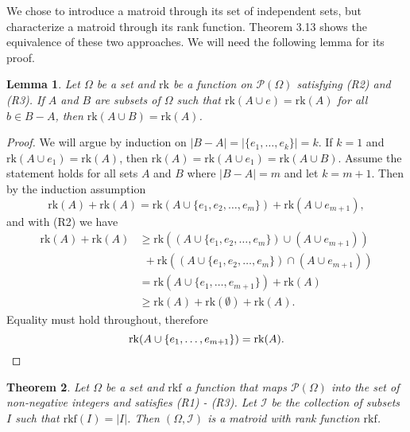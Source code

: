 \documentclass[12pt,a4paper, twoside, autooneside=false]{scrartcl}
\newtheorem{theorem}{Theorem}[section]
\newtheorem{lemma}[theorem]{Lemma}
\theoremstyle{definition}
\theoremstyle{remark}
\numberwithin{equation}{section}
\begin{document}
We chose to introduce a matroid through its set of independent sets, but \cite{GoRo2001} characterize a matroid through its rank function.
Theorem 3.13 shows the equivalence of these two approaches. We will need the following lemma for its proof.
\begin{lemma}
Let $\Omega$ be a set and $\mathrm{rk}$ be a function on $\mathcal{P}(\Omega)$ satisfying (R2) and (R3). If $A$ and $B$ are subsets of $\Omega$ such that $\mathrm{rk}(A \cup e) = \mathrm{rk}(A)$ for all $b \in B - A$, then $\mathrm{rk}(A \cup B) = \mathrm{rk}(A)$. 
\end{lemma}
\begin{proof}
We will argue by induction on $|B - A| = |\{e_1, \dots, e_k\}| = k$. If $k = 1$ and $\mathrm{rk}(A \cup e_1) = \mathrm{rk}(A)$, then $\mathrm{rk}(A) = \mathrm{rk}(A \cup e_1) = \mathrm{rk}(A \cup B)$. Assume the statement holds for all sets $A$ and $B$ where $|B - A| = m$ and let $k = m + 1$. Then by the induction assumption
\[
\mathrm{rk}(A) + \mathrm{rk}(A) = \mathrm{rk}(A \cup \{e_1, e_2, \dots, e_m\}) + \mathrm{rk}(A \cup e_{m + 1}),
\]
and with (R2) we have
\begin{align*}
\mathrm{rk}(A) + \mathrm{rk}(A) &\geq \mathrm{rk}((A \cup \{e_1, e_2, \dots, e_m\}) \cup (A \cup e_{m + 1})) \\ & \ \ + \mathrm{rk}((A \cup \{e_1, e_2, \dots, e_m\}) \cap (A \cup e_{m + 1})) \\
&= \mathrm{rk}(A \cup \{e_1, \dots, e_{m + 1}\}) + \mathrm{rk}(A) \\
&\geq \mathrm{rk}(A) + \mathrm{rk}(\emptyset) + \mathrm{rk}(A).
\end{align*}
Equality must hold throughout, therefore 
\[
\mathrm{rk}(A \cup \{e_1, \dots, e_{m + 1}\}) = \mathrm{rk}(A). \qedhere
\]
\end{proof} 
\begin{theorem}
Let $\Omega$ be a set and $\mathrm{rkf}$ a function that maps $\mathcal{P}(\Omega)$ into the set of non-negative integers and satisfies (R1) - (R3). Let $\mathcal{I}$ be the collection of subsets $I$ such that $\mathrm{rkf}(I) = |I|$. Then $(\Omega, \mathcal{I})$ is a matroid with rank function $\mathrm{rkf}$.
\end{theorem}
\end{document}
